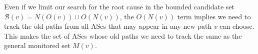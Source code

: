  %


Even if we limit our search for the root cause in the bounded candidate
set $\mathcal{B}(v) = N(O(v)) \cup O(N(v))$, the $O(N(v))$ term implies
we need to track the old paths from all ASes that may appear in any new
path $v$ can choose.  This makes the set of ASes whose old paths we need
to track the same as the general monitored set $M(v)$.

